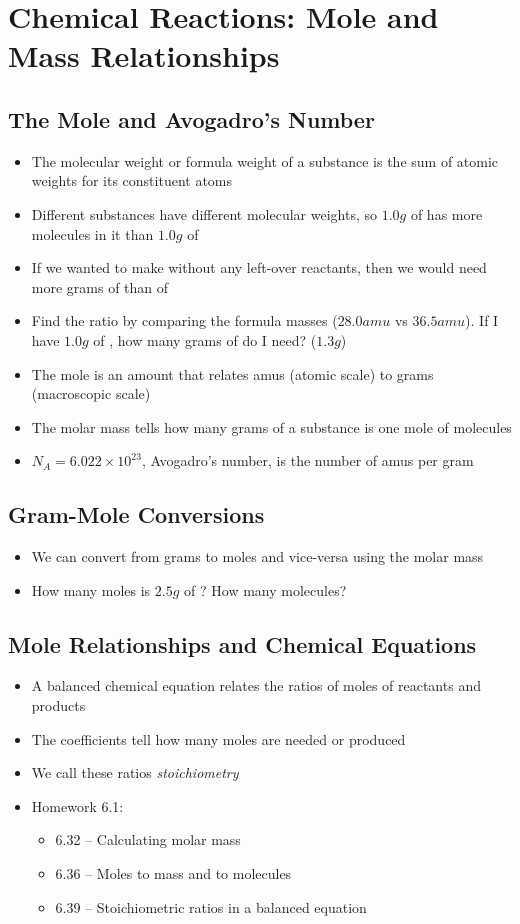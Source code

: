 \documentclass[12pt, openany, letterpaper]{memoir}
\begin{document}
\chapter{Chemical Reactions: Mole and Mass Relationships}
\section{The Mole and Avogadro's Number}
\begin{itemize}
	\item The molecular weight or formula weight of a substance is the sum of atomic weights for its constituent atoms
	\item Different substances have different molecular weights, so $1.0g$ of  has more molecules in it than $1.0g$ of 
	\item If we wanted to make  without any left-over reactants, then we would need more grams of  than of 
	\item Find the ratio by comparing the formula masses ($28.0amu$ vs $36.5amu$). If I have $1.0g$ of , how many grams of  do I need? ($1.3g$)
	\item The mole is an amount that relates amus (atomic scale) to grams (macroscopic scale)
	\item The molar mass tells how many grams of a substance is one mole of molecules
	\item $N_A=6.022\times10^{23}$, Avogadro's number, is the number of amus per gram
\end{itemize}
\section{Gram-Mole Conversions}
\begin{itemize}
	\item We can convert from grams to moles and vice-versa using the molar mass
	\item How many moles is $2.5g$ of ? How many molecules?
\end{itemize}

\section{Mole Relationships and Chemical Equations}
\begin{itemize}
	\item A balanced chemical equation relates the ratios of moles of reactants and products
	\item The coefficients tell how many moles are needed or produced
	\item We call these ratios \emph{stoichiometry}
	\item Homework 6.1:
	      \begin{itemize}
		      \item 6.32 -- Calculating molar mass
		      \item 6.36 -- Moles to mass and to molecules
		      \item 6.39 -- Stoichiometric ratios in a balanced equation
	      \end{itemize}
\end{itemize}
\end{document}
